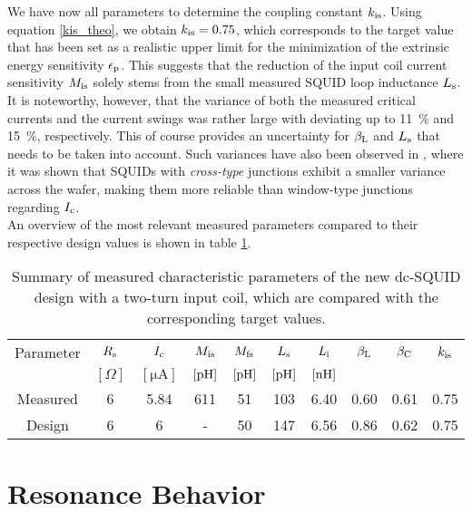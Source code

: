 We have now all parameters to determine the coupling constant $k_{\rm is}$. Using equation \ref{kis_theo}, we obtain $k_{\rm is}=0.75$, which corresponds to the target value that has been set as a realistic upper limit for the minimization of the extrinsic energy sensitivity $\epsilon_{\rm p}$. This suggests that the reduction of the input coil current sensitivity $M_{\rm is}$ solely stems from the small measured SQUID loop inductance $L_{\rm s}$. It is noteworthy, however, that the variance of both the measured critical currents and the current swings was rather large with deviating up to \qty{11}{\percent} and \qty{15}{\percent}, respectively. This of course provides an uncertainty for $\beta_{\rm L}$ and $L_{\rm s}$ that needs to be taken into account. Such variances have also been observed in \cite{Bauer2022}, where it was shown that SQUIDs with \textit{cross-type} junctions exhibit a smaller variance across the wafer, making them more reliable than window-type junctions regarding $I_{\rm c}$. \\    
An overview of the most relevant measured parameters compared to their respective design values is shown in table \ref{tab:SQUIDparameters}.

\begin{table}[htb]
	\centering
	\begin{tabular}{c|*{9}{c}}
	\toprule
		Parameter & $R_{\rm s}$ & $I_{\rm c}$ & $M_{\rm is}$ & $M_{\rm fs}$ & $L_{\rm s}$ & $L_{\rm i}$ & $\beta_{\rm L}$ & $\beta_{\rm C}$ & $k_{\rm is}$ \\
		 & $[\Omega]$ & $[\unit{\micro\ampere}]$ & $[\unit{\pH}]$ & $[\unit{\pH}]$ & $[\unit{\pH}]$ & $[\unit{\nH}]$ &  &  &  \\
		\midrule
		Measured & 6 & 5.84 & 611 & 51 & 103 & 6.40 & 0.60 & 0.61 & 0.75 \\
		Design & 6 & 6 & - & 50 & 147 & 6.56 & 0.86 & 0.62 & 0.75 \\
	\end{tabular}
	\caption{Summary of measured characteristic parameters of the new dc-SQUID design with a two-turn input coil, which are compared with the corresponding target values.}
	\label{tab:SQUIDparameters}
\end{table}

\section{Resonance Behavior}\label{sec_resonance_results}

